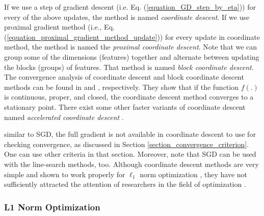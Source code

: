 \documentclass[lang=cn,10pt]{gorgeousnbook}
\numberwithin{equation}{section}%
\numberwithin{figure}{section}%
\begin{document}
If we use a step of gradient descent (i.e. Eq. (\ref{equation_GD_step_by_eta})) for every of the above updates, the method is named \textit{coordinate descent}.
If we use proximal gradient method (i.e., Eq. (\ref{equation_proximal_gradient_method_update})) for every update in coordinate method, the method is named the \textit{proximal coordinate descent}. 
Note that we can group some of the dimensions (features) together and alternate between updating the blocks (groups) of features. That method is named \textit{block coordinate descent}.
The convergence analysis of coordinate descent and block coordinate descent methods can be found in \cite{luo1992convergence,luo1993error} and \cite{tseng2001convergence}, respectively. 
They show that if the function $f(.)$ is continuous, proper, and closed, the coordinate descent method converges to a stationary point. 
There exist some other faster variants of coordinate descent named \textit{accelerated coordinate descent} \cite{lee2013efficient,fercoq2015accelerated}.

similar to SGD, the full gradient is not available in coordinate descent to use for checking convergence, as discussed in Section \ref{section_convergence_criterion}. One can use other criteria in that section. 
Moreover, note that SGD can be used with the line-search methods, too. 
Although coordinate descent methods are very simple and shown to work properly for $\ell_1$ norm optimization \cite{wu2008coordinate}, they have not sufficiently attracted the attention of researchers in the field of optimization \cite{wright2015coordinate}.


\subsubsection{L1 Norm Optimization}
\end{document}
